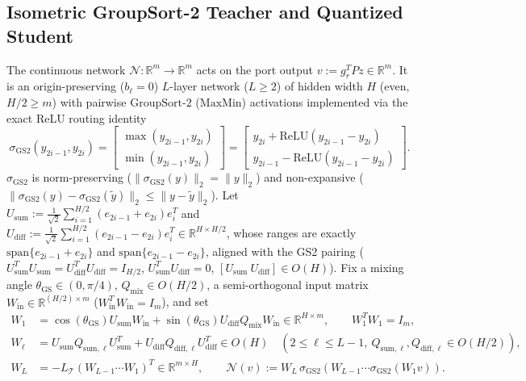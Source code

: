 \subsection{Isometric GroupSort-2 Teacher and Quantized Student}
\label{sec:teacher}
The continuous network \(\mathcal{N} : \mathbb{R}^m \to \mathbb{R}^m\) acts on the port output \(v := g_r^T P z \in \mathbb{R}^m\). It is an origin-preserving (\(b_\ell = 0\)) \(L\)-layer network (\(L \ge 2\)) of hidden width \(H\) (even, \(H/2 \ge m\)) with pairwise \(\mathrm{GroupSort\text{-}2}\) (\(\mathrm{MaxMin}\)) activations implemented via the exact ReLU routing identity
\begin{equation}
\label{eq:groupsort_relu}
\sigma_{\mathrm{GS2}}(y_{2i-1}, y_{2i}) = \begin{bmatrix} \max(y_{2i-1}, y_{2i}) \\ \min(y_{2i-1}, y_{2i}) \end{bmatrix} = \begin{bmatrix} y_{2i} + \mathrm{ReLU}(y_{2i-1} - y_{2i}) \\ y_{2i-1} - \mathrm{ReLU}(y_{2i-1} - y_{2i}) \end{bmatrix}.
\end{equation}
\(\sigma_{\mathrm{GS2}}\) is norm-preserving (\(\|\sigma_{\mathrm{GS2}}(y)\|_2 = \|y\|_2\)) and non-expansive (\(\|\sigma_{\mathrm{GS2}}(y) - \sigma_{\mathrm{GS2}}(\tilde{y})\|_2 \le \|y - \tilde{y}\|_2\)). Let \(U_{\mathrm{sum}} := \frac{1}{\sqrt2}\sum_{i=1}^{H/2}(e_{2i-1} + e_{2i})e_i^T\) and \(U_{\mathrm{diff}} := \frac{1}{\sqrt2}\sum_{i=1}^{H/2}(e_{2i-1} - e_{2i})e_i^T \in \mathbb{R}^{H\times H/2}\), whose ranges are exactly \(\mathrm{span}\{e_{2i-1} + e_{2i}\}\) and \(\mathrm{span}\{e_{2i-1} - e_{2i}\}\), aligned with the GS2 pairing (\(U_{\mathrm{sum}}^T U_{\mathrm{sum}} = U_{\mathrm{diff}}^T U_{\mathrm{diff}} = I_{H/2}\), \(U_{\mathrm{sum}}^T U_{\mathrm{diff}} = 0\), \([U_{\mathrm{sum}}\ U_{\mathrm{diff}}] \in O(H)\)). Fix a mixing angle \(\theta_{\mathrm{GS}} \in (0, \pi/4)\), \(Q_{\mathrm{mix}} \in O(H/2)\), a semi-orthogonal input matrix \(W_{\mathrm{in}} \in \mathbb{R}^{(H/2)\times m}\) (\(W_{\mathrm{in}}^T W_{\mathrm{in}} = I_m\)), and set
\begin{equation}
\label{eq:teacher_weights}
\begin{aligned}
W_1 &= \cos(\theta_{\mathrm{GS}})U_{\mathrm{sum}}W_{\mathrm{in}} + \sin(\theta_{\mathrm{GS}})U_{\mathrm{diff}}Q_{\mathrm{mix}}W_{\mathrm{in}} \in \mathbb{R}^{H\times m}, \qquad W_1^TW_1 = I_m,\\
W_\ell &= U_{\mathrm{sum}}Q_{\mathrm{sum},\ell}U_{\mathrm{sum}}^T + U_{\mathrm{diff}}Q_{\mathrm{diff},\ell}U_{\mathrm{diff}}^T \in O(H) \quad (2 \le \ell \le L-1,\ Q_{\mathrm{sum},\ell}, Q_{\mathrm{diff},\ell} \in O(H/2)),\\
W_L &= -L_{\mathcal{T}}(W_{L-1}\cdots W_1)^T \in \mathbb{R}^{m \times H}, \qquad \mathcal{N}(v) := W_L\,\sigma_{\mathrm{GS2}}(W_{L-1}\cdots\sigma_{\mathrm{GS2}}(W_1 v)).
\end{aligned}
\end{equation}

